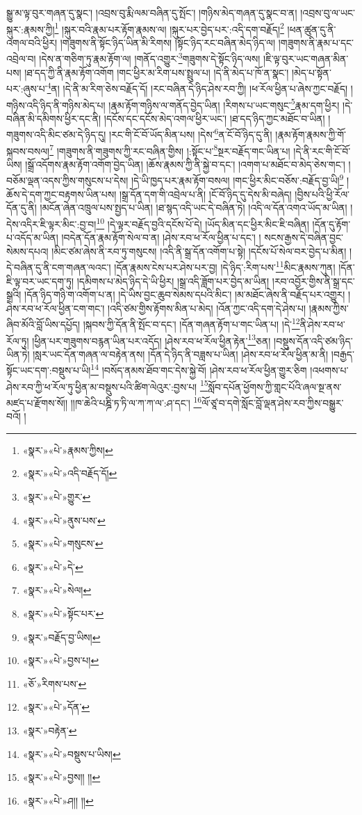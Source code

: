 སྒྱུ་མ་ལྟ་བུར་གཞན་དུ་སྣང་། །འབྲས་བུ་རྨི་ལམ་བཞིན་དུ་སྤོང་། །གཉིས་མེད་གཞན་དུ་སྣང་བ་ན། །འབྲས་བུ་ལ་ཡང་སྐུར་:རྣམས་ཀྱི།\footnote{«སྣར་»«པེ་»རྣམས་ཀྱིས།} །སྐུར་བའི་རྣམ་པར་རྟོག་རྣམས་ལ། །སྐུར་པར་བྱེད་པར་:འདི་དག་བརྗོད།\footnote{«སྣར་»«པེ་»འདི་བརྗོད་དོ།} །ཕན་ཚུན་དུ་ནི་འགལ་བའི་ཕྱིར། །གཟུགས་ནི་སྟོང་ཉིད་ཡིན་མི་རིགས། །སྟོང་ཉིད་རང་བཞིན་མེད་ཉིད་ལ། །གཟུགས་ནི་རྣམ་པ་དང་འབྲེལ་བ། །དེས་ན་གཅིག་ཏུ་རྣམ་རྟོག་ལ། །གནོད་འགྱུར་\footnote{«སྣར་»«པེ་»གྱུར་}གཟུགས་དེ་སྟོང་ཉིད་ལས། །ཇི་ལྟ་བུར་ཡང་གཞན་མིན་པས། །ཐ་དད་ཀྱི་ནི་རྣམ་རྟོག་འགོག །གང་ཕྱིར་མ་རིག་པས་སྤྲུལ་པ། །དེ་ནི་མེད་པ་ཁོ་ན་སྣང་། །མེད་པ་སྟོན་པར་:ཞུས་པ་\footnote{«སྣར་»«པེ་»ནུས་པས་}ན། །དེ་ནི་མ་རིག་ཅེས་བརྗོད་དོ། །རང་བཞིན་དེ་ཉིད་ཤེས་རབ་ཀྱི། །ཕ་རོལ་ཕྱིན་པ་ཞེས་ཀྱང་བརྗོད། །གཉིས་འདི་ཉིད་ནི་གཉིས་མེད་པ། །རྣམ་རྟོག་གཉིས་ལ་གནོད་བྱེད་ཡིན། །རིགས་པ་ཡང་གསུང་\footnote{«སྣར་»«པེ་»གསུངས་}རྣམ་དག་ཕྱིར། །དེ་བཞིན་མི་དམིགས་ཕྱིར་དང་ནི། །དངོས་དང་དངོས་མེད་འགལ་ཕྱིར་ཡང་། །ཐ་དད་ཉིད་ཀྱང་མཐོང་བ་ཡིན། །གཟུགས་འདི་མིང་ཙམ་དེ་ཉིད་དུ། །རང་གི་ངོ་བོ་ཡོད་མིན་པས། །དེས་\footnote{«སྣར་»«པེ་»དེ་}ན་ངོ་བོ་ཉིད་དུ་ནི། །རྣམ་རྟོག་རྣམས་ཀྱི་གོ་སྐབས་བསལ།\footnote{«སྣར་»«པེ་»སེལ།} །གཟུགས་ནི་གཟུགས་ཀྱི་རང་བཞིན་གྱིས། །:སྟོང་པ་\footnote{«སྣར་»«པེ་»སྟོང་པར་}སྔར་བརྗོད་གང་ཡིན་པ། །དེ་ནི་རང་གི་ངོ་བོ་ཡིས། །སྒྲོ་འདོགས་རྣམ་རྟོག་འགོག་བྱེད་ཡིན། །ཆོས་རྣམས་ཀྱི་ནི་སྐྱེ་བ་དང་། །འགག་པ་མཐོང་བ་མེད་ཅེས་གང་། །བཅོམ་ལྡན་འདས་ཀྱིས་གསུངས་པ་དེས། །དེ་ཡི་ཁྱད་པར་རྣམ་རྟོག་བསལ། །གང་ཕྱིར་མིང་བཅོས་:བརྗོད་བྱ་ཡི།\footnote{«སྣར་»བརྗོད་བྱ་ཡིས།} །ཆོས་དེ་དག་ཀྱང་བརྟགས་ཡིན་པས། །སྒྲ་དོན་དག་གི་འབྲེལ་པ་ནི། །ངོ་བོ་ཉིད་དུ་དེས་མི་བཞེད། །བྱིས་པའི་ཕྱི་རོལ་དོན་དུ་ནི། །མངོན་ཞེན་འཁྲུལ་པས་སྤྱད་པ་ཡིན། །ཐ་སྙད་འདི་ཡང་དེ་བཞིན་ཏེ། །འདི་ལ་དོན་འགའ་ཡོད་མ་ཡིན། །དེས་འདིར་ཇི་ལྟར་མིང་:བྱ་བ།\footnote{«སྣར་»«པེ་»བྱས་པ།} །དེ་ལྟར་བརྗོད་བྱའི་དངོས་པོ་དེ། །ཡོད་མིན་དང་ཕྱིར་མིང་ཇི་བཞིན། །དོན་དུ་རྟོག་པ་འདོད་མ་ཡིན། །བདེན་དོན་རྣམ་རྟོག་སེལ་བ་ན། །ཤེས་རབ་ཕ་རོལ་ཕྱིན་པ་དང་། །
སངས་རྒྱས་དེ་བཞིན་བྱང་སེམས་དཔའ། །མིང་ཙམ་ཞེས་ནི་རབ་ཏུ་གསུངས། །འདི་ནི་སྒྲ་དོན་འགོག་པ་སྟེ། །དངོས་པོ་སེལ་བར་བྱེད་པ་མིན། །དེ་བཞིན་དུ་ནི་ངག་གཞན་ལའང་། །དོན་རྣམས་ངེས་པར་ཤེས་པར་བྱ། །དེ་ཉིད་:རིག་པས་\footnote{«ཅོ་»རིགས་པས་}མིང་རྣམས་ཀུན། །དོན་ཇི་ལྟ་བར་ཡང་དག་ཏུ། །དམིགས་པ་མེད་ཉིད་དེ་ཡི་ཕྱིར། །སྒྲ་འདི་ཟློག་པར་བྱེད་མ་ཡིན། །རབ་འབྱོར་གྱིས་ནི་སྒྲ་དང་སྒྲའི། །དོན་ཉིད་གཉི་ག་འགོག་པ་ན། །དེ་ཡིས་བྱང་ཆུབ་སེམས་དཔའི་མིང་། །མ་མཐོང་ཞེས་ནི་བརྗོད་པར་འགྱུར། །ཤེས་རབ་ཕ་རོལ་ཕྱིན་ངག་གང་། །འདི་ཙམ་གྱིས་རྟོགས་མིན་པ་མེད། །འོན་ཀྱང་འདི་དག་དེ་ཤེས་པ། །རྣམས་ཀྱིས་ཞིབ་མོའི་བློ་ཡིས་དཔྱོད། །སྐབས་ཀྱི་དོན་ནི་སྤོང་བ་དང་། །དོན་གཞན་རྟོག་པ་གང་ཡིན་པ། །དེ་\footnote{«སྣར་»«པེ་»དོན་}ནི་ཤེས་རབ་ཕ་རོལ་ཏུ། །ཕྱིན་པར་གཟུགས་བརྙན་ཡིན་པར་འདོད། །ཤེས་རབ་ཕ་རོལ་ཕྱིན་རྟེན་\footnote{«སྣར་»བརྟེན་}ཅན། །བསྡུས་དོན་འདི་ཙམ་ཉིད་ཡིན་ཏེ། །སླར་ཡང་དོན་གཞན་ལ་བརྟེན་ནས། །དོན་དེ་ཉིད་ནི་བཟླས་པ་ཡིན། །ཤེས་རབ་ཕ་རོལ་ཕྱིན་མ་ནི། །བརྒྱད་སྟོང་ཡང་དག་:བསྡུས་པ་ཡི།\footnote{«སྣར་»«པེ་»བསྡུས་པ་ཡིས།} །བསོད་ནམས་ཐོབ་གང་དེས་སྐྱེ་བོ། །ཤེས་རབ་ཕ་རོལ་ཕྱིན་གྱུར་ཅིག །འཕགས་པ་ཤེས་རབ་ཀྱི་ཕ་རོལ་ཏུ་ཕྱིན་མ་བསྡུས་པའི་ཚིག་ལེའུར་:བྱས་པ། \footnote{«སྣར་»«པེ་»བྱས།། །། }སློབ་དཔོན་ཕྱོགས་ཀྱི་གླང་པོའི་ཞལ་སྔ་ནས་མཛད་པ་རྫོགས་སོ།། །།ཁ་ཆེའི་པཎྜི་ཏ་ཏི་ལ་ཀ་ཀ་ལ་:ཤ་དང་། \footnote{«སྣར་»«པེ་»ཤ།། །། }ལོ་ཙཱ་བ་དགེ་སློང་བློ་ལྡན་ཤེས་རབ་ཀྱིས་བསྒྱུར་བའོ། ། 